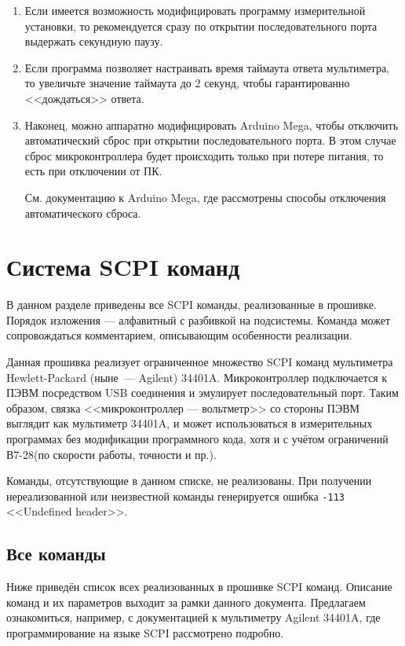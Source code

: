 \documentclass[12pt, a4paper]{article}
\newcommand{\SCPI}{\mbox{SCPI}}
\newcommand{\V}{\mbox{В7-28}}
\newcommand{\Arduino}{Arduino Mega}
\newcommand{\CMD}[1]{{\tt #1}}
\begin{document}
\begin{enumerate}

\item Если имеется возможность модифицировать программу измерительной установки, то рекомендуется сразу по открытии последовательного порта выдержать секундную паузу.

\item Если программа позволяет настраивать время таймаута ответа мультиметра, то увеличьте значение таймаута до 2 секунд, чтобы гарантированно <<дождаться>> ответа.

\item Наконец, можно аппаратно модифицировать {\Arduino}, чтобы отключить автоматический сброс при открытии последовательного порта. В этом случае сброс микроконтроллера будет происходить только при потере питания, то есть при отключении от ПК.

См. документацию к {\Arduino}, где рассмотрены способы отключения автоматического сброса.

\end{enumerate}


\section{Система SCPI команд}

В данном разделе приведены все \SCPI{} команды, реализованные в прошивке. Порядок изложения --- алфавитный с разбивкой на подсистемы. Команда может сопровождаться комментарием, описывающим особенности реализации.

Данная прошивка реализует ограниченное множество \SCPI{} команд мультиметра Hewlett-Packard (ныне~--- Agilent) \mbox{34401A}. Микроконтроллер подключается к ПЭВМ посредством USB соединения и эмулирует последовательный порт. Таким образом, связка <<микроконтроллер --- вольтметр>> со стороны ПЭВМ выглядит как мультиметр \mbox{34401A}, и может использоваться в измерительных программах без модификации программного кода, хотя и с учётом ограничений \V (по скорости работы, точности и пр.).

Команды, отсутствующие в данном списке, не реализованы. При получении нереализованной или неизвестной команды генерируется ошибка \CMD{-113} <<Undefined header>>.

\subsection{Все команды}

Ниже приведён список  всех реализованных в прошивке SCPI команд. Описание команд и их параметров выходит за рамки данного документа. Предлагаем ознакомиться, например, с документацией к мультиметру Agilent 34401A, где программирование на языке SCPI рассмотрено подробно.
\end{document}
